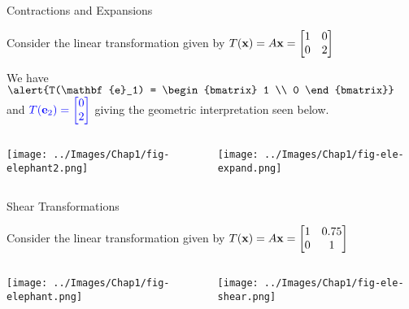 \documentclass[xcoler=dvipsnames, aspectratio=169]{beamer}
\begin{document}
\begin{frame}{Contractions and Expansions}

Consider the linear transformation given by $\displaystyle T(\mathbf{x}) = A \mathbf{x} = \begin{bmatrix} 1 & 0 \\ 0 & 2 \end{bmatrix}$ 

We have  $\dsty \alert{T(\mathbf{e}_1) = \begin{bmatrix} 1 \\ 0 \end{bmatrix}}$ and $\displaystyle \textcolor{blue}{T(\mathbf{e}_2) = \begin{bmatrix} 0 \\ 2 \end{bmatrix}}$ giving the geometric interpretation seen below.

\begin{columns}

\column{0.5\tw}

\begin{center}
\texttt{[image: ../Images/Chap1/fig-elephant2.png]}
\end{center}

\column{0.5\tw}

\begin{center}
\texttt{[image: ../Images/Chap1/fig-ele-expand.png]}
\end{center}

\end{columns}

\end{frame}

\begin{frame}{Shear Transformations}

Consider the linear transformation given by $\displaystyle T(\mathbf{x}) = A \mathbf{x} = \begin{bmatrix} 1 & 0.75 \\ 0 & 1 \end{bmatrix}$ 


\begin{columns}

\column{0.5\tw}

\begin{center}
\texttt{[image: ../Images/Chap1/fig-elephant.png]}
\end{center}

\column{0.5\tw}

\begin{center}
\texttt{[image: ../Images/Chap1/fig-ele-shear.png]}
\end{center}

\end{columns}

\end{frame}
\end{document}
